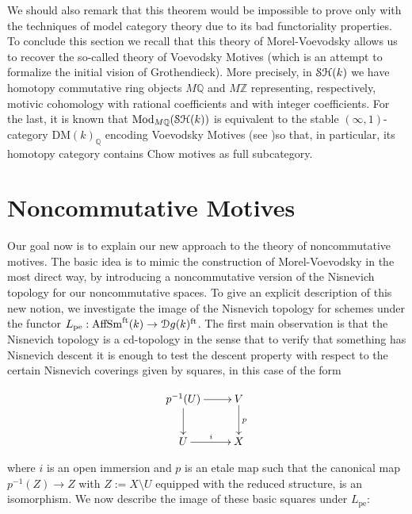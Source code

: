 \begin{refsection}
We should also remark that this theorem would be impossible to prove only with the techniques of model category theory due to its bad functoriality properties.\\

To conclude this section we recall that this theory of Morel-Voevodsky allows us to recover the so-called theory of Voevodsky Motives (which is an attempt to formalize the initial vision of Grothendieck). More precisely, in $\mathcal{S}\mathcal{H}(k)$ we have homotopy commutative ring objects $M\mathbb{Q}$ and $M\mathbb{Z}$ representing, respectively,  motivic cohomology with rational coefficients and with integer coefficients. For the last, it is known that $\mathrm{Mod}_{M\mathbb{Q}}(\mathcal{S}\mathcal{H}(k))$ is equivalent to the stable $(\infty,1)$-category $\mathrm{DM}(k)_{\mathbb{Q}}$ encoding Voevodsky Motives (see \cite{motiviccohomology-lectures, rodingsostaer})so that, in particular, its homotopy category contains $\mathrm{Chow}$ motives as full subcategory.

\section{Noncommutative Motives}

Our goal now is to explain our new approach to the theory of noncommutative motives. The basic idea is to mimic the construction of Morel-Voevodsky in the most direct way, by introducing a noncommutative version of the Nisnevich topology for our noncommutative spaces. To give an explicit description of this new notion,  we investigate the image of the Nisnevich topology for schemes under the functor $L_\mathrm{pe}: \mathrm{AffSm}^{\mathrm{ft}}(k)\to \mathcal{D}g(k)^\mathrm{ft}$. The first main observation is that the Nisnevich topology is a cd-topology in the sense that to verify that something has Nisnevich descent it is enough to test the descent property with respect to the certain Nisnevich coverings given by squares, in this case of the form

$$
\xymatrix{
p^{-1}(U)\ar[r]\ar[d]& V\ar[d]^{p}\\ 
U\ar[r]^i& X
}
$$ 

\noindent where $i$ is an open immersion and $p$ is an etale map such that the canonical map $p^{-1}(Z)\to Z$ with $Z:=X \setminus U$ equipped with the reduced structure, is an isomorphism. We now describe the image of these basic squares under $L_\mathrm{pe}$:


\end{refsection}
